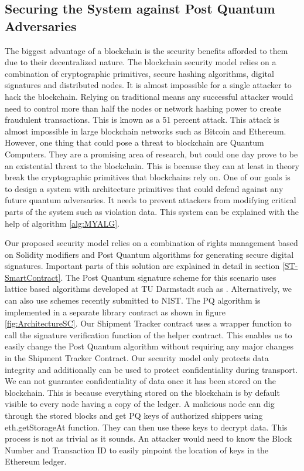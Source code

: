 \subsection{Securing the System against Post Quantum Adversaries}
The biggest advantage of a blockchain is the security benefits afforded to them due to their decentralized nature. The blockchain security model relies on a combination of cryptographic primitives, secure hashing algorithms, digital signatures and distributed nodes. It is almost impossible for a single attacker to hack the blockchain. Relying on traditional means any successful attacker would need to control more than half the nodes or network hashing power to create fraudulent transactions. This is known as a 51 percent attack. This attack is almost impossible in large blockchain networks such as Bitcoin and Ethereum. However, one thing that could pose a threat to blockchain are Quantum Computers. They are a promising area of research, but could one day prove to be an existential threat to the blockchain. This is because they can at least in theory break the cryptographic primitives that blockchains rely on. One of our goals is to design a system with architecture primitives that could defend against any future quantum adversaries. It needs to prevent attackers from modifying critical parts of the system such as violation data. This system can be explained with the help of algorithm \ref{alg:MYALG}.  

Our proposed security model relies on a combination of rights management based on Solidity modifiers and Post Quantum algorithms for generating secure digital signatures. Important parts of this solution are explained in detail in section \ref{ST-SmartContract}. The Post Quantum signature scheme for this scenario uses lattice based algorithms developed at TU Darmstadt such as \cite{cryptoeprint:2011:484}. Alternatively, we can also use schemes recently submitted to NIST. The PQ algorithm is implemented in a separate library contract as shown in figure \ref{fig:ArchitectureSC}. Our Shipment Tracker contract uses a wrapper function to call the signature verification function of the helper contract. This enables us to easily change the Post Quantum algorithm without requiring any major changes in the Shipment Tracker Contract. Our security model only protects data integrity and additionally can be used to protect confidentiality during transport. We can not guarantee confidentiality of data once it has been stored on the blockchain.  This is because everything stored on the blockchain is by default visible to every node having a copy of the ledger. A malicious node can dig through the stored blocks and get PQ keys of authorized shippers using eth.getStorageAt function. They can then use these keys to decrypt data. This process is not as trivial as it sounds. An attacker would need to know the Block Number and Transaction ID to easily pinpoint the location of keys in the Ethereum ledger. %


